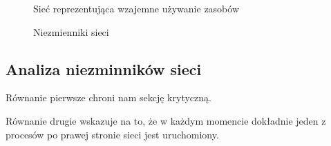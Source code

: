 
\begin{figure}[h!]
	\caption{Sieć reprezentująca wzajemne używanie zasobów}
	\label{zad2:graph1}
\end{figure}
\begin{figure}[h!]
	\caption{Niezmienniki sieci}
	\label{zad2:graph1}
\end{figure}

\subsection{Analiza niezminników sieci}
Równanie pierwsze chroni nam sekcję krytyczną. 

Równanie drugie wskazuje na to, że w każdym momencie dokładnie jeden z procesów 
po prawej stronie sieci jest uruchomiony.

